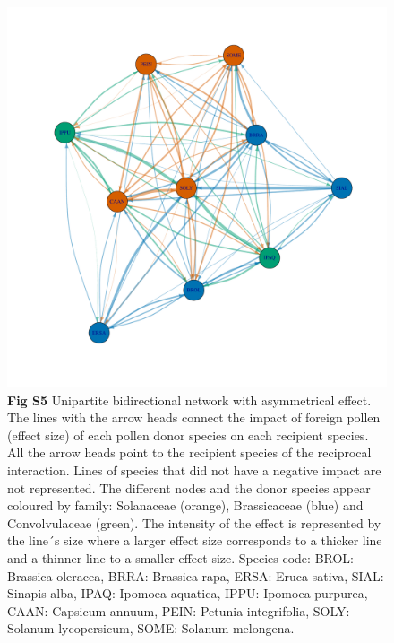 \documentclass[
  12pt,
]{article}
\begin{document}
\newpage

\begin{figure}
\centering
\includegraphics{Supp_Material_files/figure-latex/unnamed-chunk-8-1.pdf}
\caption{\textbf{Fig S5} Unipartite bidirectional network with
asymmetrical effect. The lines with the arrow heads connect the impact
of foreign pollen (effect size) of each pollen donor species on each
recipient species. All the arrow heads point to the recipient species of
the reciprocal interaction. Lines of species that did not have a
negative impact are not represented. The different nodes and the donor
species appear coloured by family: Solanaceae (orange), Brassicaceae
(blue) and Convolvulaceae (green). The intensity of the effect is
represented by the line´s size where a larger effect size corresponds to
a thicker line and a thinner line to a smaller effect size. Species
code: BROL: Brassica oleracea, BRRA: Brassica rapa, ERSA: Eruca sativa,
SIAL: Sinapis alba, IPAQ: Ipomoea aquatica, IPPU: Ipomoea purpurea,
CAAN: Capsicum annuum, PEIN: Petunia integrifolia, SOLY: Solanum
lycopersicum, SOME: Solanum melongena.}
\end{figure}

\clearpage
\end{document}
